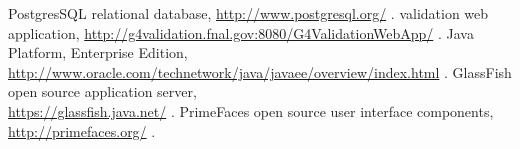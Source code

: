  PostgresSQL relational database,
                       \url{http://www.postgresql.org/} .
 \Gfour validation web application,
               \url{http://g4validation.fnal.gov:8080/G4ValidationWebApp/} .
 Java Platform, Enterprise Edition,
           \url{http://www.oracle.com/technetwork/java/javaee/overview/index.html} .
 GlassFish open source application server, \\
                        \url{https://glassfish.java.net/} .
 PrimeFaces open source user interface components, \\
                         \url{http://primefaces.org/} .


